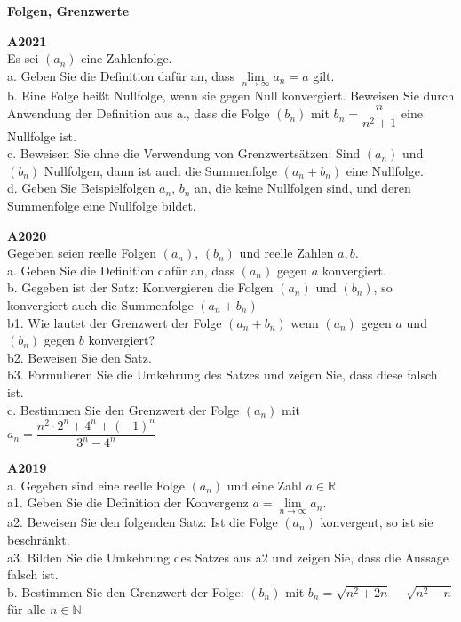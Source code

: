 \documentclass[landscape,twocolumn,a4paper]{article}
\begin{document}
\parindent 0mm


\textbf{Folgen, Grenzwerte}
\bigskip 

\textbf{A2021} \\
Es sei $(a_n)$ eine Zahlenfolge. \\
a. Geben Sie die Definition dafür an, dass $\lim \limits_{n \to \infty} a_n = a$ gilt.\\
b. Eine Folge heißt Nullfolge, wenn sie gegen Null konvergiert. Beweisen Sie durch Anwendung
der Definition aus a.,  dass die Folge $(b_n)$ mit $b_n = \dfrac{n}{n^2+1}$ eine Nullfolge ist. \\
c. Beweisen Sie ohne die Verwendung von Grenzwertsätzen: Sind $(a_n)$ und $(b_n)$ Nullfolgen, dann
ist auch die Summenfolge $(a_n + b_n)$ eine Nullfolge. \\
d. Geben Sie Beispielfolgen $a_n$, $b_n$ an, die keine Nullfolgen sind, und deren Summenfolge eine
Nullfolge bildet.
\bigskip 

\textbf{A2020} \\
Gegeben seien reelle Folgen $(a_n)$, $(b_n)$ und reelle Zahlen $a, b$.\\
a. Geben Sie die Definition dafür an, dass $(a_n)$ gegen $a$ konvergiert. \\
b. Gegeben ist der Satz: Konvergieren die Folgen  $(a_n)$ und  $(b_n)$, so konvergiert
auch die Summenfolge $(a_n + b_n)$ \\
b1. Wie lautet der Grenzwert der Folge $(a_n + b_n)$ wenn  $(a_n)$ gegen $a$ und $(b_n)$ gegen $b$
konvergiert? \\
b2. Beweisen Sie den Satz. \\
b3. Formulieren Sie die Umkehrung des Satzes und zeigen Sie, dass diese falsch ist. \\
c. Bestimmen Sie den Grenzwert der Folge $(a_n)$  mit \\
$a_n = \dfrac{n^2 \cdot 2^n + 4^n + (-1)^n}{3^n - 4^n}$
 
\bigskip 

\textbf{A2019} \\
a. Gegeben sind eine reelle Folge $(a_n)$ und eine Zahl $a \in \mathbb{R}$ \\
a1. Geben Sie die Definition der Konvergenz $a = \lim \limits_{n \to \infty} a_n$. \\
a2. Beweisen Sie den folgenden Satz: Ist die Folge $(a_n)$ konvergent, so ist sie beschränkt. \\
a3. Bilden Sie die Umkehrung des Satzes aus a2 und zeigen Sie, dass die Aussage falsch ist. \\
b. Bestimmen Sie den Grenzwert der Folge: $(b_n)$ mit $b_n = \sqrt{n^2+2n} - \sqrt{n^2-n}$ für alle $n \in
\mathbb{N}$
\bigskip 
\end{document}
